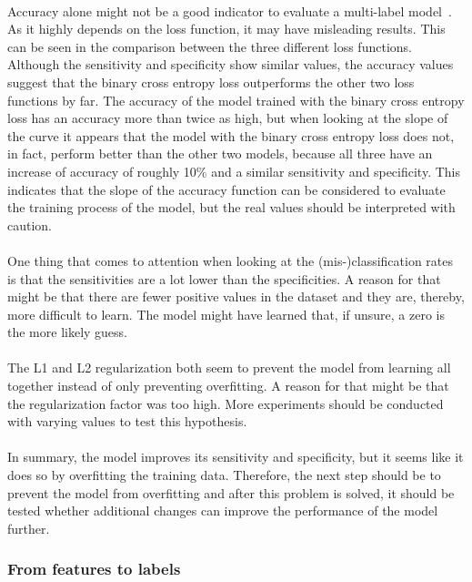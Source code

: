 \\
Accuracy alone might not be a good indicator to evaluate a multi-label model~\citep{gibaja2015}. As it highly depends on the loss function, it may have misleading results. This can be seen in the comparison between the three different loss functions. Although the sensitivity and specificity show similar values, the accuracy values suggest that the binary cross entropy loss outperforms the other two loss functions by far. The accuracy of the model trained with the binary cross entropy loss has an accuracy more than twice as high, but when looking at the slope of the curve it appears that the model with the binary cross entropy loss does not, in fact, perform better than the other two models, because all three have an increase of accuracy of roughly 10\% and a similar sensitivity and specificity. This indicates that the slope of the accuracy function can be considered to evaluate the training process of the model, but the real values should be interpreted with caution. \\
\\
One thing that comes to attention when looking at the (mis-)classification rates is that the sensitivities are a lot lower than the specificities. A reason for that might be that there are fewer positive values in the dataset and they are, thereby, more difficult to learn. The model might have learned that, if unsure, a zero is the more likely guess. \\
\\
The L1 and L2 regularization both seem to prevent the model from learning all together instead of only preventing overfitting. A reason for that might be that the regularization factor was too high. More experiments should be conducted with varying values to test this hypothesis. \\
\\
In summary, the model improves its sensitivity and specificity, but it seems like it does so by overfitting the training data. Therefore, the next step should be to prevent the model from overfitting and after this problem is solved, it should be tested whether additional changes can improve the performance of the model further.



\subsubsection{From features to labels}
\label{subsec:FeaturesToLabels}

